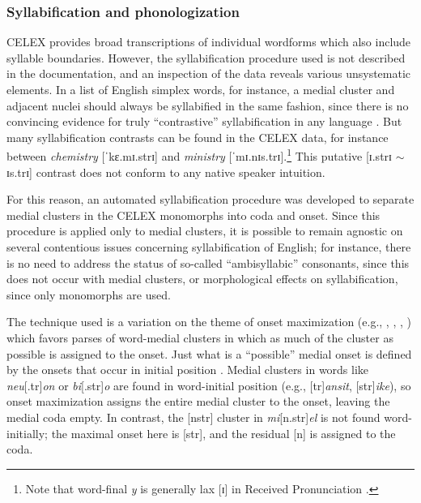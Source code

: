 \subsubsection{Syllabification and phonologization}

CELEX provides broad transcriptions of individual wordforms which also include syllable boundaries. However, the syllabification procedure used is not described in the documentation, and an inspection of the data reveals various unsystematic elements. In a list of English simplex words, for instance, a medial cluster and adjacent nuclei should always be syllabified in the same fashion, since there is no convincing evidence for truly ``contrastive'' syllabification in any language \citep[see]{Elfner2006}. But many syllabification contrasts can be found in the CELEX data, for instance between \emph{chemistry} [ˈkɛ.mɪ.strɪ] and \emph{ministry} [ˈmɪ.nɪs.trɪ].\footnote{Note that word-final \emph{y} is generally lax [ɪ] in Received Pronunciation \citep[][II.294]{AOE}.} This putative [ɪ.strɪ $\sim$ ɪs.trɪ] contrast does not conform to any native speaker intuition.

For this reason, an automated syllabification procedure was developed to separate medial clusters in the CELEX  monomorphs into coda and onset. Since this procedure is applied only to medial clusters, it is possible to remain agnostic on several contentious issues concerning syllabification of English; for instance, there is no need to address the status of so-called ``ambisyllabic'' consonants, since this does not occur with medial clusters, or morphological effects on syllabification, since only monomorphs are used. 

The technique used is a variation on the theme of onset maximization (e.g., \citealt{Kurylowicz1948}, \citealt[75]{Pulgram1970}, \citealt[42f.]{Kahn1976}, \citealt[][358f.]{Selkirk1982b}) which favors parses of word-medial clusters in which as much of the cluster as possible is assigned to the onset. Just what is a ``possible'' medial onset is defined by the onsets that occur in initial position \citep[though cf.][36]{Fischer-Jorgensen1952}. Medial clusters in words like \emph{neu}[.tr]\emph{on} or \emph{bi}[.str]\emph{o} are found in word-initial position (e.g., [tr]\emph{ansit}, [str]\emph{ike}), so onset maximization assigns the entire medial cluster to the onset, leaving the medial coda empty. In contrast, the [nstr] cluster in \emph{mi}[n.str]\emph{el} is not found word-initially; the maximal onset here is [str], and the residual [n] is assigned to the coda.

